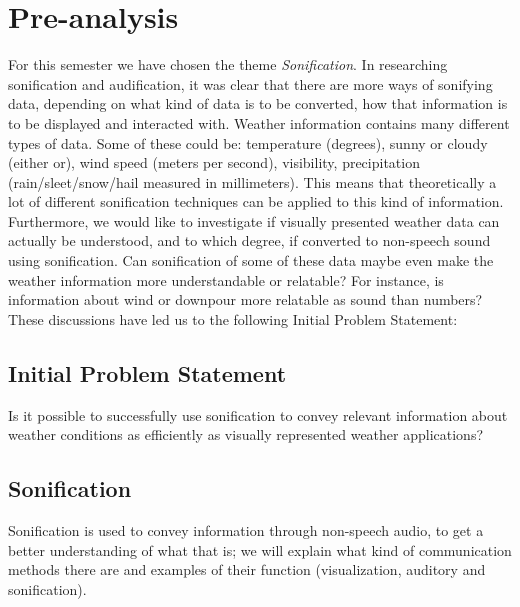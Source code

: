 
\section{Pre-analysis} %
\label{sec:preanalysis}

For this semester we have chosen the theme \textit{Sonification}.
In researching sonification and audification, it was clear that there are more ways of sonifying data, depending on what kind of data is to be converted, how that information is to be displayed and interacted with. 
Weather information contains many different types of data. 
Some of these could be:
temperature (degrees), sunny or cloudy (either or), wind speed (meters per second), visibility, precipitation (rain/sleet/snow/hail measured in millimeters). 
This means that theoretically a lot of different sonification techniques can be applied to this kind of information. 
Furthermore, we would like to investigate if visually presented weather data can actually be understood, and to which degree, if converted to non-speech sound using sonification. 
Can sonification of some of these data maybe even make the weather information more understandable or relatable? 
For instance, is information about wind or downpour more relatable as sound than numbers? These discussions have led us to the following Initial Problem Statement:


\subsection{Initial Problem Statement} %
\label{sub:initial_problem_statement}

Is it possible to successfully use sonification to convey relevant information about \newline 
weather conditions as efficiently as visually represented weather applications?



\subsection{Sonification} %
\label{sub:sonification}

Sonification is used to convey information through non-speech audio, to get a better understanding of what that is; 
we will explain what kind of communication methods there are and examples of their function (visualization, auditory and sonification).


